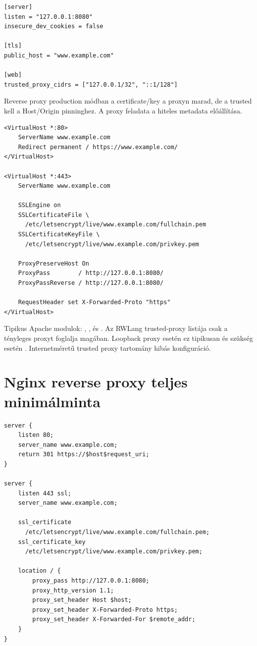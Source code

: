 \begin{lstlisting}
[server]
listen = "127.0.0.1:8080"
insecure_dev_cookies = false

[tls]
public_host = "www.example.com"

[web]
trusted_proxy_cidrs = ["127.0.0.1/32", "::1/128"]
\end{lstlisting}

Reverse proxy production módban a certificate/key a proxyn marad, de a trusted  kell a Host/Origin pinninghez. A proxy feladata a hiteles  metadata előállítása.

\begin{lstlisting}
<VirtualHost *:80>
    ServerName www.example.com
    Redirect permanent / https://www.example.com/
</VirtualHost>

<VirtualHost *:443>
    ServerName www.example.com

    SSLEngine on
    SSLCertificateFile \
      /etc/letsencrypt/live/www.example.com/fullchain.pem
    SSLCertificateKeyFile \
      /etc/letsencrypt/live/www.example.com/privkey.pem

    ProxyPreserveHost On
    ProxyPass        / http://127.0.0.1:8080/
    ProxyPassReverse / http://127.0.0.1:8080/

    RequestHeader set X-Forwarded-Proto "https"
</VirtualHost>
\end{lstlisting}

Tipikus Apache modulok: , ,  és . Az RWLang trusted-proxy listája csak a tényleges proxyt foglalja magában. Loopback proxy esetén ez tipikusan  és szükség esetén . Internetméretű trusted proxy tartomány hibás konfiguráció.

\section{Nginx reverse proxy teljes minimálminta}

\begin{lstlisting}
server {
    listen 80;
    server_name www.example.com;
    return 301 https://$host$request_uri;
}

server {
    listen 443 ssl;
    server_name www.example.com;

    ssl_certificate
      /etc/letsencrypt/live/www.example.com/fullchain.pem;
    ssl_certificate_key
      /etc/letsencrypt/live/www.example.com/privkey.pem;

    location / {
        proxy_pass http://127.0.0.1:8080;
        proxy_http_version 1.1;
        proxy_set_header Host $host;
        proxy_set_header X-Forwarded-Proto https;
        proxy_set_header X-Forwarded-For $remote_addr;
    }
}
\end{lstlisting}

